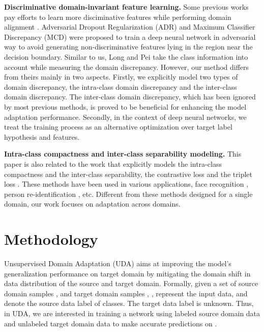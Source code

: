 \documentclass[10pt,twocolumn,letterpaper]{article}
\begin{document}
\noindent\textbf{Discriminative domain-invariant feature learning.}
Some previous works pay efforts to learn more disciminative features while 
performing domain alignment \cite{sener2016learning,haeusser2017associative,saito2017adversarial,saito2017maximum,pei2018multi,wang2018visual}.
Adversarial Dropout Regularization (ADR) \cite{saito2017adversarial} 
and Maximum Classifier Discrepancy (MCD) \cite{saito2017maximum} were proposed to train 
a deep neural network in adversarial way to avoid generating non-discriminative features lying in the region near the decision boundary.
Similar to us, Long \etal \cite{long2013transfer} and Pei \etal \cite{pei2018multi} take the class information into account while measuring the domain discrepancy. However, our method differs from theirs mainly in two aspects. 
Firstly, we explicitly model two types of domain discrepancy, \ie
the intra-class domain discrepancy and the inter-class domain discrepancy.
The inter-class domain discrepancy, which has been ignored by most previous methods,
is proved to be beneficial for enhancing 
the model adaptation performance.
Secondly, in the context of deep neural networks, 
we treat the training process as 
an alternative optimization over target label hypothesis and features.

\noindent\textbf{Intra-class compactness and inter-class separability modeling.}
This paper is also related to the work that explicitly models the intra-class compactness and the inter-class separability, \eg the contrastive loss \cite{hadsell2006dimensionality} and the triplet loss \cite{schroff2015facenet}. These methods have been used in various applications, 
\eg face recognition \cite{cheng2016person}, person re-identification \cite{hermans2017defense}, etc. Different from these methods designed for a single domain, our work focuses on adaptation across domains. 

















%
 
\section{Methodology}

Unsupervised Domain Adaptation (UDA) aims at improving the model's generalization performance on target domain
by mitigating the domain shift in data distribution of the source and target domain.
Formally, given a set of source domain samples 
,
and target domain samples
, ,  represent the input data, 
and  denote the source data label of  classes. 
The target data label  is unknown.
Thus, in UDA,  
we are interested in training a network using labeled source domain data  and unlabeled target domain data  to make accurate predictions  on .
\end{document}
